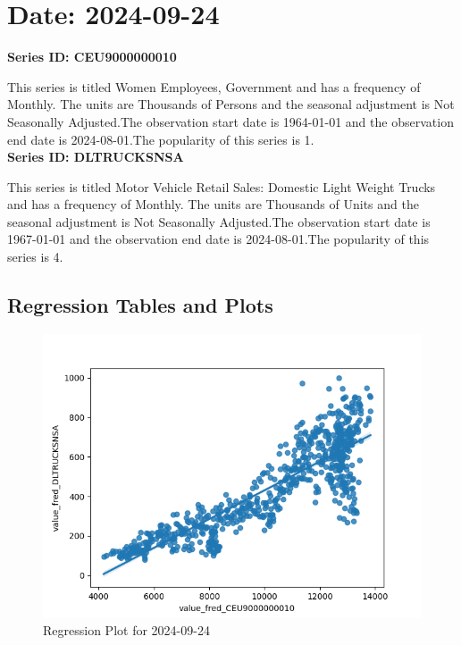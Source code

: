 \section{Date: 2024-09-24}
\noindent \textbf{Series ID: CEU9000000010} 

\noindent This series is titled Women Employees, Government and has a frequency of Monthly. The units are Thousands of Persons and the seasonal adjustment is Not Seasonally Adjusted.The observation start date is 1964-01-01 and the observation end date is 2024-08-01.The popularity of this series is 1. \\ 

\noindent \textbf{Series ID: DLTRUCKSNSA} 

\noindent This series is titled Motor Vehicle Retail Sales: Domestic Light Weight Trucks and has a frequency of Monthly. The units are Thousands of Units and the seasonal adjustment is Not Seasonally Adjusted.The observation start date is 1967-01-01 and the observation end date is 2024-08-01.The popularity of this series is 4. \\ 

\subsection{Regression Tables and Plots}


\begin{figure}
\centering
\includegraphics[scale = 0.9]{plots/plot_2024-09-24.png}
\caption{Regression Plot for 2024-09-24}
\end{figure}
\newpage
